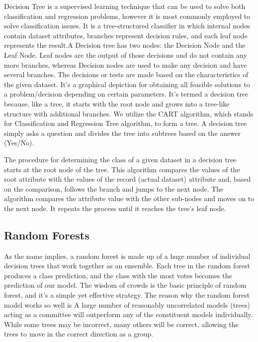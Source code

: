\documentclass{article}
\begin{document}
Decision Tree is a supervised learning technique that can be used to solve both classification and regression problems, however it is most commonly employed to solve classification issues. It is a tree-structured classifier in which internal nodes contain dataset attributes, branches represent decision rules, and each leaf node represents the result.A Decision tree has two nodes: the Decision Node and the Leaf Node.
Leaf nodes are the output of those decisions and do not contain any more branches, whereas Decision nodes are used to make any decision and have several branches.
The decisions or tests are made based on the characteristics of the given dataset. It's a graphical depiction for obtaining all feasible solutions to a problem/decision depending on certain parameters. It's termed a decision tree because, like a tree, it starts with the root node and grows into a tree-like structure with additional branches.
We utilize the CART algorithm, which stands for Classification and Regression Tree algorithm, to form a tree.
A decision tree simply asks a question and divides the tree into subtrees based on the answer (Yes/No). 

The procedure for determining the class of a given dataset in a decision tree starts at the root node of the tree. This algorithm compares the values of the root attribute with the values of the record (actual dataset) attribute and, based on the comparison, follows the branch and jumps to the next node. The algorithm compares the attribute value with the other sub-nodes and moves on to the next node. It repeats the process until it reaches the tree's leaf node. 

\subsection{Random Forests}
As the name implies, a random forest is made up of a huge number of individual decision trees that work together as an ensemble.
Each tree in the random forest produces a class prediction, and the class with the most votes becomes the prediction of our model.
The wisdom of crowds is the basic principle of random forest, and it's a simple yet effective strategy.
The reason why the random forest model works so well is A large number of reasonably uncorrelated models (trees) acting as a committee will outperform any of the constituent models individually.  While some trees may be incorrect, many others will be correct, allowing the trees to move in the correct direction as a group. 
\end{document}
